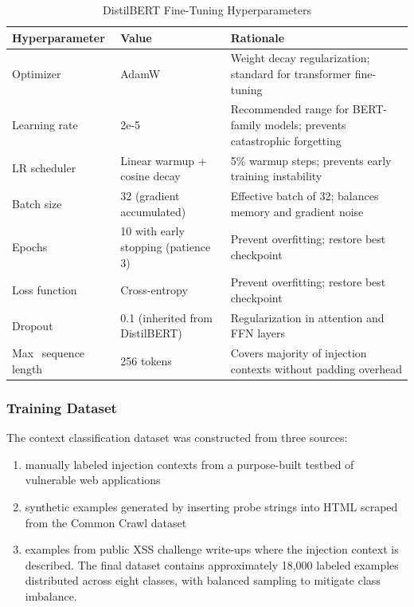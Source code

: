 \begin{table}[h]
    \centering
    \begin{tabular}{|p{2.7cm}|p{4cm}|p{7.3cm}|}
      \hline
        Hyperparameter & Value  &Rationale \\
         \hline
        Optimizer &AdamW  & Weight decay regularization; standard for transformer fine-tuning\\ \hline
         Learning rate&2e-5  &Recommended range for BERT-family models; prevents catastrophic forgetting
 \\ \hline
         LR scheduler&Linear warmup + cosine decay  & 5\% warmup steps; prevents early training instability\\ \hline
         
         Batch size & 32 (gradient accumulated) &Effective batch of 32; balances memory and gradient noise \\ \hline
         
         Epochs &10 with early stopping (patience 3)  & Prevent overfitting; restore best checkpoint\\ \hline
         Loss function & Cross-entropy &Prevent overfitting; restore best checkpoint \\ \hline
         Dropout &0.1 (inherited from DistilBERT)  & Regularization in attention and FFN layers\\ \hline
         Max\textcolor{white}{\_\allowbreak }sequence length& 256 tokens & Covers majority of injection contexts without padding overhead
\\
    \hline
    \end{tabular}
    \caption{DistilBERT Fine-Tuning Hyperparameters}
    
\end{table}

\subsubsection{Training Dataset}
The context classification dataset was constructed from three sources: 
\begin{enumerate}
    \item manually labeled injection contexts from a purpose-built testbed of vulnerable web applications
    \item synthetic examples generated by inserting probe strings into HTML scraped from the Common Crawl dataset
    \item examples from public XSS challenge write-ups where the injection context is described. The final dataset contains approximately 18,000 labeled examples distributed across eight classes, with balanced sampling to mitigate class imbalance.
\end{enumerate}


